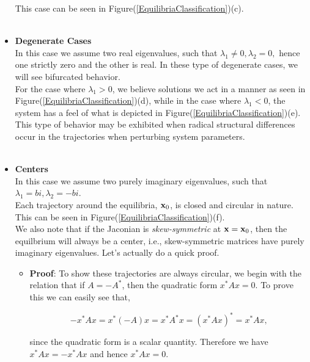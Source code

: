 \begin{itemize}
This case can be seen in Figure(\ref{EquilibriaClassification})(c). \\

$ $\\


\item[ ] {\bf{Degenerate Cases}}\\

In this case we assume two real eigenvalues, such that $\lambda_1\neq0,\lambda_2=0,$ hence one strictly zero and the other is real. In these type of degenerate cases, we will see bifurcated behavior. \\

For the case where $\lambda_1>0$, we believe solutions we act in a manner as seen in Figure(\ref{EquilibriaClassification})(d), while in the case where $\lambda_1<0$, the system has a feel of what is depicted in Figure(\ref{EquilibriaClassification})(e).\\

This type of behavior may be exhibited when radical structural differences occur in the trajectories when perturbing system parameters. \\

$ $\\


\item[ ] {\bf{Centers}}\\

In this case we assume two purely imaginary eigenvalues, such that $\lambda_1=bi,\lambda_2=-bi.$\\ Each trajectory around the equilibria, ${\bf{x}}_0$, is closed and circular in nature. This can be seen in Figure(\ref{EquilibriaClassification})(f). \\

We also note that if the Jaconian is \emph{skew-symmetric} at ${\bf{x}}={\bf{x}}_0$, then the equilbrium will always be a center, i.e., skew-symmetric matrices have purely imaginary eigenvalues. Let's actually do a quick proof.  

\begin{itemize}
\item[ ] {\bf{Proof}}: To show these trajectories are always circular, we begin with the relation that if $A=-A^*$, then the quadratic form $x^* A x = 0$. To prove this we can easily see that,

$$- x^* A x = x^* (-A) x = x^* A^* x = (x^* A x)^* = x^* A x,$$

since the quadratic form is a scalar quantity. Therefore we have $x^* A x = - x^* A x$ and hence $x^* A x = 0.$


\end{itemize}
\end{itemize}
